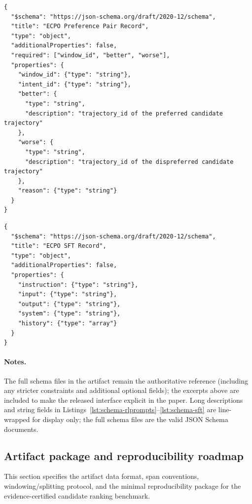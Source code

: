 \documentclass{article}
\begin{document}
\begin{lstlisting}[caption={Schema excerpt for \texttt{pairs.schema.json} (Preference Pair Record).},label={lst:schema-pairs}]
{
  "$schema": "https://json-schema.org/draft/2020-12/schema",
  "title": "ECPO Preference Pair Record",
  "type": "object",
  "additionalProperties": false,
  "required": ["window_id", "better", "worse"],
  "properties": {
    "window_id": {"type": "string"},
    "intent_id": {"type": "string"},
    "better": {
      "type": "string",
      "description": "trajectory_id of the preferred candidate trajectory"
    },
    "worse": {
      "type": "string",
      "description": "trajectory_id of the dispreferred candidate trajectory"
    },
    "reason": {"type": "string"}
  }
}
\end{lstlisting}

\begin{lstlisting}[caption={Schema excerpt for \texttt{sft.schema.json} (SFT Record).},label={lst:schema-sft}]
{
  "$schema": "https://json-schema.org/draft/2020-12/schema",
  "title": "ECPO SFT Record",
  "type": "object",
  "additionalProperties": false,
  "properties": {
    "instruction": {"type": "string"},
    "input": {"type": "string"},
    "output": {"type": "string"},
    "system": {"type": "string"},
    "history": {"type": "array"}
  }
}
\end{lstlisting}

\paragraph{Notes.}
The full schema files in the artifact remain the authoritative reference (including any stricter constraints and additional optional fields); the excerpts above are included to make the released interface explicit in the paper. Long descriptions and string fields in Listings~\ref{lst:schema-rlprompts}--\ref{lst:schema-sft} are line-wrapped for display only; the full schema files are the valid JSON Schema documents.

\subsection{Artifact package and reproducibility roadmap}
\label{sec:app_data}

This section specifies the artifact data format, span conventions, windowing/splitting protocol, and the minimal reproducibility package for the evidence-certified candidate ranking benchmark.
\end{document}
